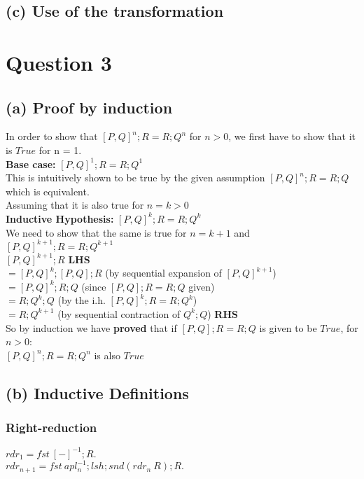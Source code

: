 \documentclass[a4paper,10pt]{article}
\begin{document}
\subsection*{(c) Use of the transformation}



\section*{Question 3}
\subsection*{(a) Proof by induction}
In order to show that $[P,Q]^{n};R = R;Q^n$ for $n>0$, we first have to show that it is $True$ for n = 1.
\\[0.5cm]
\textbf{Base case:} $[P,Q]^{1};R=R;Q^1$
\\[0.5cm]
This is intuitively shown to be true by the given assumption $[P,Q]^{n};R=R;Q$ which is equivalent.
\\[0.5cm]
Assuming that it is also true for  $n = k > 0$ 
\\[0.5cm]
\textbf{Inductive Hypothesis:} $[P,Q]^{k};R = R;Q^k$
\\[0.5cm]
We need to show that the same is true for $n = k+1$ and $[P,Q]^{k+1};R = R;Q^{k+1}$
\\[0.5cm]
 $[P,Q]^{k+1};R $ \textbf{LHS}
\\[0.25cm]
$= [P,Q]^k;[P,Q];R$ (by sequential expansion of $[P,Q]^{k+1}$)
\\[0.25cm]
$= [P,Q]^k;R;Q$ (since $[P,Q];R = R;Q$ given)
\\[0.25cm]
$= R;Q^k;Q$ (by the i.h. $[P,Q]^{k};R = R;Q^k$)
\\[0.25cm]
$= R;Q^{k+1}$ (by sequential contraction of $Q^{k};Q$)  \textbf{RHS}
\\[0.5cm]
So by induction we have \textbf{proved} that if $[P,Q];R = R;Q$ is given to be $True$, for $n>0$:
\\[0.5cm]
$[P,Q]^{n};R = R;Q^n$ 
is also $True$
\subsection*{(b) Inductive Definitions}
\subsubsection*{Right-reduction}
$rdr_1 = fst\:  [-]^{-1};R.$ \\[0.25cm]
$rdr_{n+1} = fst\:  apl_{n}^{-1};lsh;snd(rdr_n\: R);R.$
\end{document}
